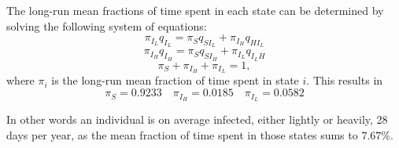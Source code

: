 
The long-run mean fractions of time spent in each state can be determined by solving the following system of equations:
$$ \pi_{I_L} q_{I_L} = \pi_S q_{S{I_L}} + \pi_{I_H} q_{H{I_L}}$$
$$ \pi_{I_H} q_{I_H} = \pi_S q_{S{I_H}} + \pi_{I_L} q_{{I_L}H}$$
$$ \pi_S + \pi_{I_H} +\pi_{I_L} = 1, $$
where $\pi_i$ is the long-run mean fraction of time spent in state $i$. This results in 
$$\pi_S = 0.9233 \quad \pi_{I_H} = 0.0185 \quad \pi_{I_L} = 0.0582$$

In other words an individual is on average infected, either lightly or heavily, 28 days per year, as the mean fraction of time spent in those states sums to $7.67\%$.

